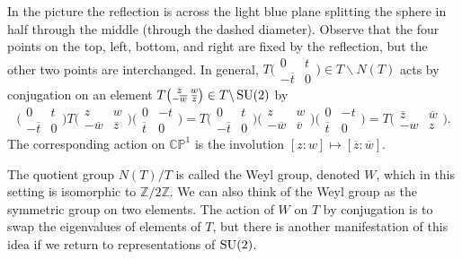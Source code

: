 \documentclass[../../rtnotes.tex]{subfiles}
\begin{document}
In the picture the reflection is across the light blue plane splitting the sphere in half through the middle (through the dashed diameter). Observe that the four points on the top, left, bottom, and right are fixed by the reflection, but the other two points are interchanged. In general, $T\bigl(\!\begin{smallmatrix}
    0 & t \\ -\overline t & 0
\end{smallmatrix}\!\bigr)\in T\backslash N(T)$ acts by conjugation on an element $T\bigl(\!\begin{smallmatrix}
    z & w \\ -\overline w & \overline z
\end{smallmatrix}\!\bigr)\in T\backslash \operatorname{SU}(2)$ by
\[\bigl(\!\begin{smallmatrix}
    0 & t \\ -\overline t & 0
\end{smallmatrix}\!\bigr)T\bigl(\!\begin{smallmatrix}
    z & w \\ -\overline w & \overline z
\end{smallmatrix}\!\bigr)\bigl(\!\begin{smallmatrix}
    0 & -t \\ \overline t & 0
\end{smallmatrix}\!\bigr) = T\bigl(\!\begin{smallmatrix}
    0 & t \\ -\overline t & 0
\end{smallmatrix}\!\bigr)\bigl(\!\begin{smallmatrix}
    z & w \\ -\overline w & \overline v
\end{smallmatrix}\!\bigr)\bigl(\!\begin{smallmatrix}
    0 & -t \\ \overline t & 0
\end{smallmatrix}\!\bigr) = T\bigl(\!\begin{smallmatrix}
    \overline z & \overline w \\ -w & z
\end{smallmatrix}\!\bigr).\] 
The corresponding action on $\mathbb{CP}^1$ is the involution $[z:w]\mapsto [\overline z:\overline w]$.

The quotient group $N(T)/T$ is called the Weyl group, denoted $W$, which in this setting is isomorphic to $\mathbb Z/2\mathbb Z$. We can also think of the Weyl group as the symmetric group on two elements. The action of $W$ on $T$ by conjugation is to swap the eigenvalues of elements of $T$, but there is another manifestation of this idea if we return to representations of $\operatorname{SU}(2)$.
\end{document}
